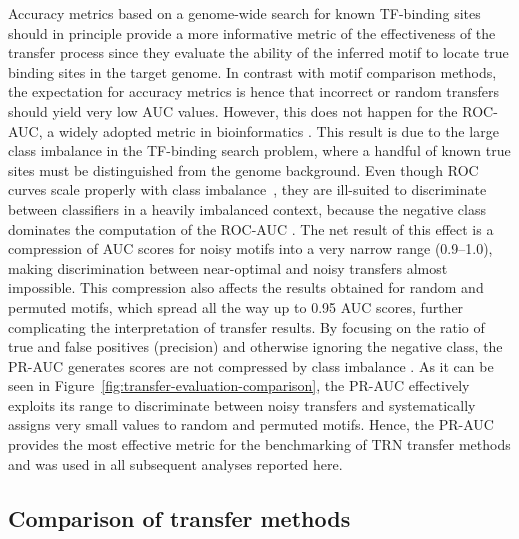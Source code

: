 Accuracy metrics based on a genome-wide search for known TF-binding sites
should in principle provide a more informative metric of the effectiveness of
the transfer process since they evaluate the ability of the inferred motif to
locate true binding sites in the target genome. In contrast with motif
comparison methods, the expectation for accuracy metrics is hence that
incorrect or random transfers should yield very low AUC values. However, this
does not happen for the ROC-AUC, a widely adopted metric in bioinformatics
\cite{saito2015precision}. This result is due to the large class imbalance in
the TF-binding search problem, where a handful of known true sites must be
distinguished from the genome background. Even though ROC curves scale properly
with class imbalance~\cite{fawcett2006introduction}, they are ill-suited to
discriminate between classifiers in a heavily imbalanced context, because the
negative class dominates the computation of the ROC-AUC
\cite{davis2006relationship}. The net result of this effect is a compression of
AUC scores for noisy motifs into a very narrow range (0.9--1.0), making
discrimination between near-optimal and noisy transfers almost impossible. This
compression also affects the results obtained for random and permuted motifs,
which spread all the way up to 0.95 AUC scores, further complicating the
interpretation of transfer results. By focusing on the ratio of true and false
positives (precision) and otherwise ignoring the negative class, the PR-AUC
generates scores are not compressed by class imbalance
\cite{saito2015precision, davis2006relationship}. As it can be seen in
Figure~\ref{fig:transfer-evaluation-comparison}, the PR-AUC effectively
exploits its range to discriminate between noisy transfers and systematically
assigns very small values to random and permuted motifs. Hence, the PR-AUC
provides the most effective metric for the benchmarking of TRN transfer methods
and was used in all subsequent analyses reported here.

\subsection{Comparison of transfer methods}

